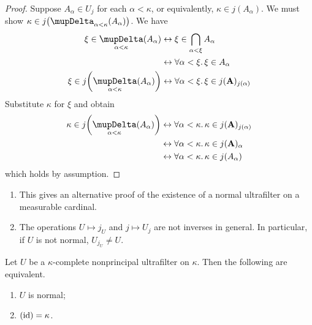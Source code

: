 \begin{proof}
    Suppose \( A_\alpha \in U_j \) for each \( \alpha < \kappa \), or equivalently, \( \kappa \in j(A_\alpha) \).
    We must show \( \kappa \in j\qty(\operatorname*{\scalerel*{\mupDelta}{\textstyle\sum}}_{\alpha < \kappa}(A_\alpha)) \).
    We have
    \begin{align*}
        \xi \in \operatorname*{\scalerel*{\mupDelta}{\textstyle\sum}}_{\alpha < \kappa}(A_\alpha) &\leftrightarrow \xi \in \bigcap_{\alpha < \xi} A_\alpha \\
        &\leftrightarrow \forall \alpha < \xi.\, \xi \in A_\alpha \\
        \xi \in j\qty(\operatorname*{\scalerel*{\mupDelta}{\textstyle\sum}}_{\alpha < \kappa}(A_\alpha)) &\leftrightarrow \forall \alpha < \xi.\, \xi \in j(\vb A)_{j(\alpha)}
    \end{align*}
    Substitute \( \kappa \) for \( \xi \) and obtain
    \begin{align*}
        \kappa \in j\qty(\operatorname*{\scalerel*{\mupDelta}{\textstyle\sum}}_{\alpha < \kappa}(A_\alpha)) &\leftrightarrow \forall \alpha < \kappa.\, \kappa \in j(\vb A)_{j(\alpha)} \\
        &\leftrightarrow \forall \alpha < \kappa.\, \kappa \in j(\vb A)_\alpha \\
        &\leftrightarrow \forall \alpha < \kappa.\, \kappa \in j(A_\alpha)
    \end{align*}
    which holds by assumption.
\end{proof}
\begin{remark}
    \begin{enumerate}
        \item This gives an alternative proof of the existence of a normal ultrafilter on a measurable cardinal.
        \item The operations \( U \mapsto j_U \) and \( j \mapsto U_j \) are not inverses in general.
        In particular, if \( U \) is not normal, \( U_{j_U} \neq U \).
    \end{enumerate}
\end{remark}
\begin{proposition}
    Let \( U \) be a \( \kappa \)-complete nonprincipal ultrafilter on \( \kappa \).
    Then the following are equivalent.
    \begin{enumerate}
        \item \( U \) is normal;
        \item \( (\operatorname{id}) = \kappa \).
    \end{enumerate}
\end{proposition}
